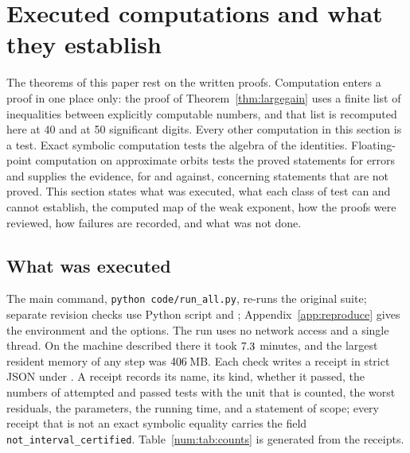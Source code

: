\ifdefined\VthreeExactPassed\else\fi
\ifdefined\ExponentAgreement\else\fi
\section{Executed computations and what they establish}\label{sec:evidence}
The theorems of this paper rest on the written proofs. Computation enters a proof in one place only: the proof of Theorem~\ref{thm:largegain} uses a finite list of inequalities between explicitly computable numbers, and that list is recomputed here at 40 and at 50 significant digits. Every other computation in this section is a test. Exact symbolic computation tests the algebra of the identities. Floating-point computation on approximate orbits tests the proved statements for errors and supplies the evidence, for and against, concerning statements that are not proved. This section states what was executed, what each class of test can and cannot establish, the computed map of the weak exponent, how the proofs were reviewed, how failures are recorded, and what was not done.

\subsection{What was executed}\label{num:sec:executed}
The main command, \texttt{python code/run\_all.py}, re-runs the original suite; separate revision checks use Python script  and ; Appendix~\ref{app:reproduce} gives the environment and the options. The run uses no network access and a single thread. On the machine described there it took $7.3$ minutes, and the largest resident memory of any step was $406$\,MB. Each check writes a receipt in strict JSON under . A receipt records its name, its kind, whether it passed, the numbers of attempted and passed tests with the unit that is counted, the worst residuals, the parameters, the running time, and a statement of scope; every receipt that is not an exact symbolic equality carries the field \texttt{not\_interval\_certified}. Table~\ref{num:tab:counts} is generated from the receipts.

